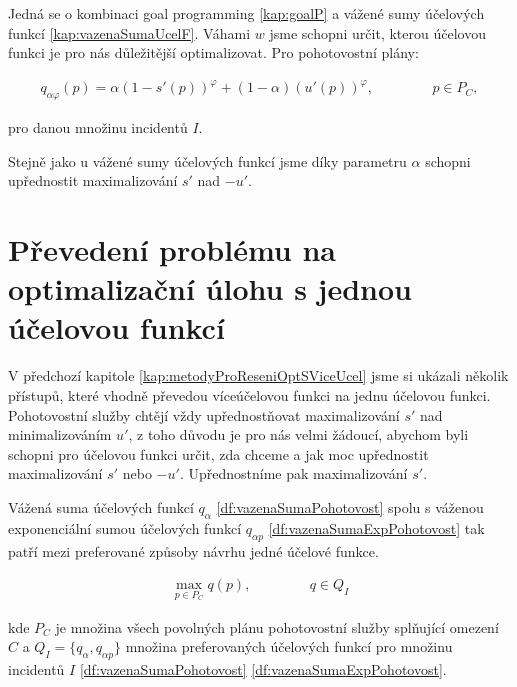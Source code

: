 Jedná se o kombinaci goal programming \ref{kap:goalP} a vážené sumy účelových funkcí \ref{kap:vazenaSumaUcelF}.
Váhami $w$ jsme schopni určit, kterou účelovou funkci je pro nás důležitější optimalizovat. Pro pohotovostní plány:

\begin{definice}\label{df:vazenaSumaExpPohotovost}
  \begin{align*}
    q_{\alpha \varphi}(p) = \alpha (1 - s'(p))^\varphi + (1 - \alpha)(u'(p))^\varphi, \hspace{50pt} p \in P_C,
  \end{align*}

  pro danou množinu incidentů $I$.
\end{definice}

Stejně jako u vážené sumy účelových funkcí jsme díky parametru $\alpha$ schopni upřednostit maximalizování $s'$ nad $-u'$.

\section{Převedení problému na optimalizační úlohu s jednou účelovou funkcí}\label{kap:opt1Uc}

V předchozí kapitole \ref{kap:metodyProReseniOptSViceUcel} jsme si ukázali několik přístupů, které vhodně převedou víceúčelovou funkci na jednu účelovou funkci.
Pohotovostní služby chtějí vždy upřednostňovat maximalizování $s'$ nad minimalizováním $u'$,
z toho důvodu je pro nás velmi žádoucí, abychom byli schopni pro účelovou funkci určit, zda chceme a jak moc upřednostit maximalizování $s'$ nebo $-u'$.
Upřednostníme pak maximalizování $s'$.

Vážená suma účelových funkcí $q_{\alpha}$ \ref{df:vazenaSumaPohotovost} spolu s
váženou exponenciální sumou účelových funkcí $q_{\alpha p}$ \ref{df:vazenaSumaExpPohotovost} tak patří mezi preferované způsoby návrhu jedné účelové funkce.

\begin{definice}\label{df:optUloha1uc}
  \begin{align*}
    \max_{p \in P_C} q(p), \hspace{50pt} q \in Q_I
  \end{align*}

  kde $P_C$ je množina všech povolných plánu pohotovostní služby splňující omezení $C$
  a $Q_I = \{ q_{\alpha}, q_{\alpha p}\}$ množina preferovaných účelových funkcí pro množinu incidentů $I$ \ref{df:vazenaSumaPohotovost} \ref{df:vazenaSumaExpPohotovost}.
\end{definice}

